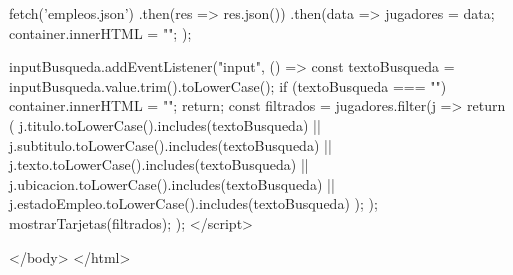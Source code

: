    
    fetch('empleos.json')
      .then(res => res.json())
      .then(data => {
        jugadores = data;
        container.innerHTML = "";
      });


    inputBusqueda.addEventListener("input", () => {
      const textoBusqueda = inputBusqueda.value.trim().toLowerCase();
      if (textoBusqueda === "") {
        container.innerHTML = "";
        return;
      }
      const filtrados = jugadores.filter(j => {
        return (
          j.titulo.toLowerCase().includes(textoBusqueda) ||
          j.subtitulo.toLowerCase().includes(textoBusqueda) ||
          j.texto.toLowerCase().includes(textoBusqueda) ||
          j.ubicacion.toLowerCase().includes(textoBusqueda) ||
          j.estadoEmpleo.toLowerCase().includes(textoBusqueda)
        );
      });
      mostrarTarjetas(filtrados);
    });
  </script>

</body>
</html>






